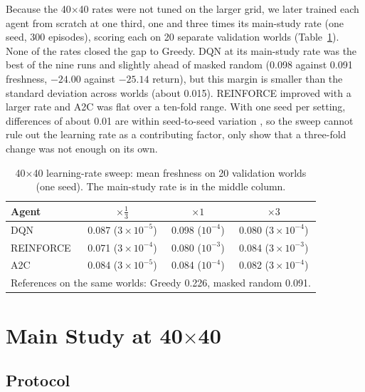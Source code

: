Because the 40$\times$40 rates were not tuned on the larger grid, we later trained each agent
from scratch at one third, one and three times its main-study rate (one seed, 300 episodes),
scoring each on 20 separate validation worlds (Table~\ref{tab:lr}). None of the rates closed
the gap to Greedy. DQN at its main-study rate was the best of the nine runs and slightly ahead of masked
random (0.098 against 0.091 freshness, $-24.00$ against $-25.14$ return), but this margin is
smaller than the standard deviation across worlds (about 0.015). REINFORCE improved with a
larger rate and A2C was flat over a ten-fold range. With one seed per setting, differences of
about 0.01 are within seed-to-seed variation \cite{henderson2018}, so the sweep cannot rule
out the learning rate as a contributing factor, only show that a three-fold change was not
enough on its own.

\begin{table}[!t]
\centering
\caption{40$\times$40 learning-rate sweep: mean freshness on 20 validation worlds (one seed).
The main-study rate is in the middle column.}
\label{tab:lr}
\scriptsize
\setlength{\tabcolsep}{4pt}
\begin{tabular}{lccc}
\toprule
Agent & $\times\tfrac{1}{3}$ & $\times 1$ & $\times 3$ \\
\midrule
DQN & 0.087 ($3\!\times\!10^{-5}$) & 0.098 ($10^{-4}$) & 0.080 ($3\!\times\!10^{-4}$) \\
REINFORCE & 0.071 ($3\!\times\!10^{-4}$) & 0.080 ($10^{-3}$) & 0.084 ($3\!\times\!10^{-3}$) \\
A2C & 0.084 ($3\!\times\!10^{-5}$) & 0.084 ($10^{-4}$) & 0.082 ($3\!\times\!10^{-4}$) \\
\midrule
\multicolumn{4}{l}{References on the same worlds: Greedy 0.226, masked random 0.091.} \\
\bottomrule
\end{tabular}
\end{table}

\section{Main Study at 40$\times$40}

\subsection{Protocol}

